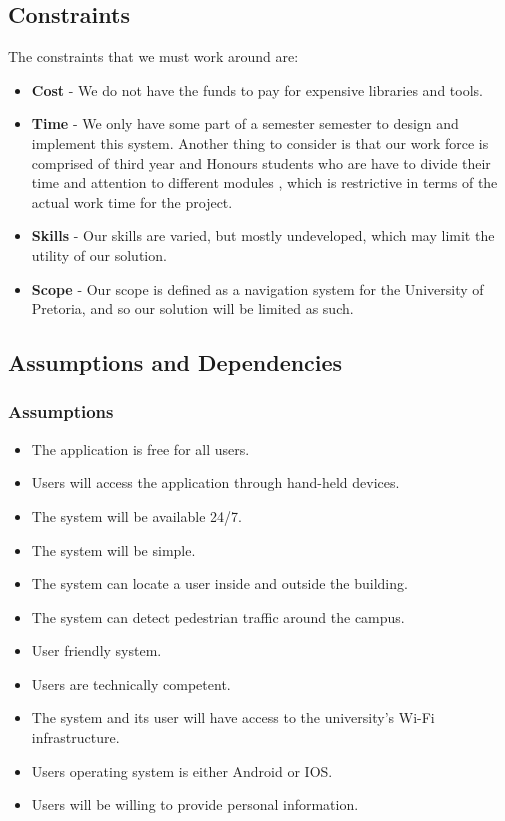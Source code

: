 \documentclass[english]{article}
\begin{document}
		\subsection{Constraints}
                The constraints that we must work around are:
			    \begin{itemize}
			        \item \textbf{Cost} - We do not have the funds to pay for expensive libraries and tools.
			        \item \textbf{Time} - We only have some part of a semester semester to design and implement this system. Another thing to consider is that our work force is comprised of third year and Honours students who are have to divide their time and attention to different modules , which is restrictive in terms of the actual work time for the project.
			        \item \textbf{Skills} - Our skills are varied, but mostly undeveloped, which may limit the utility of our solution.
			        \item \textbf{Scope} - Our scope is defined as a navigation system for the University of Pretoria, and so our solution will be limited as such.
			    \end{itemize}

		\subsection{Assumptions and Dependencies}
		\subsubsection{Assumptions}
	\begin{itemize}
		\item The application is free for all users.
		\item Users will access the application through hand-held devices.
		\item The system will be available 24/7.
		\item The system will be simple.
		\item The system can locate a user inside and outside the building.
		\item The system can detect pedestrian traffic around the campus.
		\item User friendly system.
		\item Users are technically competent.
		\item The system and its user will have access to the university's Wi-Fi infrastructure.
		\item Users operating system is either Android or IOS.
		\item Users will be willing to provide personal information.

\end{itemize}
\end{document}
